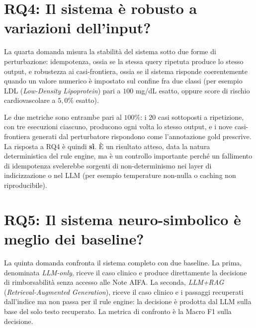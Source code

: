 \section{RQ4: Il sistema è robusto a variazioni dell'input?}
\label{sec:rq4}

La quarta domanda misura la stabilità del sistema sotto due forme di perturbazione: idempotenza, ossia se la stessa query ripetuta produce lo stesso output, e robustezza ai casi-frontiera, ossia se il sistema risponde coerentemente quando un valore numerico è impostato sul confine fra due classi (per esempio LDL (\emph{Low-Density Lipoprotein}) pari a $100$ mg/dL esatto, oppure score di rischio cardiovascolare a $5{,}0\%$ esatto).

Le due metriche sono entrambe pari al $100\%$: i $20$ casi sottoposti a ripetizione, con tre esecuzioni ciascuno, producono ogni volta lo stesso output, e i nove casi-frontiera generati dal perturbatore rispondono come l'annotazione gold prescrive. La risposta a RQ4 è quindi \textbf{sì}. È un risultato atteso, data la natura deterministica del rule engine, ma è un controllo importante perché un fallimento di idempotenza svelerebbe sorgenti di non-determinismo nei layer di indicizzazione o nel LLM (per esempio temperature non-nulla o caching non riproducibile).

\section{RQ5: Il sistema neuro-simbolico è meglio dei baseline?}
\label{sec:rq5}

La quinta domanda confronta il sistema completo con due baseline. La prima, denominata \emph{LLM-only}, riceve il caso clinico e produce direttamente la decisione di rimborsabilità senza accesso alle Note AIFA. La seconda, \emph{LLM+RAG} (\emph{Retrieval-Augmented Generation}), riceve il caso clinico e i passaggi recuperati dall'indice ma non passa per il rule engine: la decisione è prodotta dal LLM sulla base del solo testo recuperato. La metrica di confronto è la Macro F1 sulla decisione.

